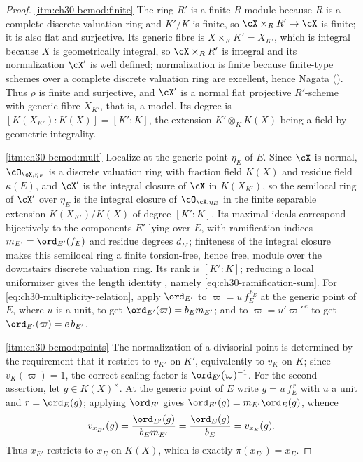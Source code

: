 \begin{proof}
\cref{itm:ch30-bcmod:finite}  The ring $R'$ is a finite $R$-module
because $R$ is a complete discrete valuation ring and $K'/K$ is finite,
so $\cX\times_RR'\to\cX$ is finite; it is also flat and surjective.  Its
generic fibre is $X\times_KK'=X_{K'}$, which is integral because $X$ is
geometrically integral, so $\cX\times_RR'$ is integral and its
normalization $\cX'$ is well defined; normalization is finite because
finite-type schemes over a complete discrete valuation ring are excellent,
hence Nagata (\cite[Tag 035S]{stacks-project}).  Thus $\rho$ is finite and
surjective, and $\cX'$ is a normal flat projective $R'$-scheme with
generic fibre $X_{K'}$, that is, a model.  Its degree is
$[K(X_{K'}):K(X)]=[K':K]$, the extension $K'\otimes_KK(X)$ being a field
by geometric integrality.

\cref{itm:ch30-bcmod:mult}  Localize at the generic point $\eta_E$ of
$E$.  Since $\cX$ is normal, $\cO_{\cX,\eta_E}$ is a discrete
valuation ring with fraction field $K(X)$ and residue field
$\kappa(E)$, and $\cX'$ is the integral closure of $\cX$ in
$K(X_{K'})$, so the semilocal ring of $\cX'$ over $\eta_E$ is the
integral closure of $\cO_{\cX,\eta_E}$ in the finite separable extension
$K(X_{K'})/K(X)$ of degree $[K':K]$.  Its maximal ideals correspond
bijectively to the components $E'$ lying over $E$, with ramification
indices $m_{E'}=\ord_{E'}(f_E)$ and residue degrees $d_{E'}$; finiteness of the integral closure makes this semilocal ring a finite
torsion-free, hence free, module over the downstairs discrete valuation
ring.  Its rank is $[K':K]$; reducing a local uniformizer gives the
length identity
\cite[Ch.~VI]{ZariskiSamuelII}, namely
\eqref{eq:ch30-ramification-sum}.  For
\eqref{eq:ch30-multiplicity-relation}, apply $\ord_{E'}$ to
$\varpi=u\,f_E^{\,b_E}$ at the generic point of $E$, where $u$ is a
unit, to get $\ord_{E'}(\varpi)=b_Em_{E'}$; and to
$\varpi=u'\varpi'^{\,e}$ to get $\ord_{E'}(\varpi)=e\,b_{E'}$.

\cref{itm:ch30-bcmod:points}  The normalization of a divisorial point is
determined by the requirement that it restrict to $v_{K'}$ on $K'$,
equivalently to $v_K$ on $K$; since $v_K(\varpi)=1$, the correct
scaling factor is $\ord_{E'}(\varpi)^{-1}$.  For the second assertion,
let $g\in K(X)^\times$.  At the generic point of $E$ write
$g=u\,f_E^{\,r}$ with $u$ a unit and $r=\ord_E(g)$; applying
$\ord_{E'}$ gives $\ord_{E'}(g)=m_{E'}\ord_E(g)$, whence
\[
 v_{x_{E'}}(g)=\frac{\ord_{E'}(g)}{b_Em_{E'}}
              =\frac{\ord_E(g)}{b_E}=v_{x_E}(g).
\]
Thus $x_{E'}$ restricts to $x_E$ on $K(X)$, which is exactly
$\pi(x_{E'})=x_E$.


\end{proof}
